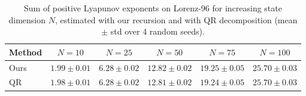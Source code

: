 \begin{table}[h]
  \centering
  \vspace{4pt}
  {\small
  \begin{tabular}{lccccc}
    \toprule
    Method & $N = 10$ & $N = 25$ & $N = 50$ & $N = 75$ & $N = 100$ \\
    \midrule
    Ours & $1.99 \pm 0.01$ & $6.28 \pm 0.02$ & $12.82 \pm 0.02$ & $19.25 \pm 0.05$ & $25.70 \pm 0.03$ \\
    QR   & $1.98 \pm 0.01$ & $6.28 \pm 0.02$ & $12.81 \pm 0.02$ & $19.24 \pm 0.05$ & $25.70 \pm 0.03$ \\
    \bottomrule
  \end{tabular}
  }
  \vspace{8pt}
  \caption{Sum of positive Lyapunov exponents on Lorenz-96 for increasing state dimension $N$, estimated with our recursion and with QR decomposition (mean $\pm$ std over 4 random seeds).}
  \label{tab:lorenz96}
\end{table}
